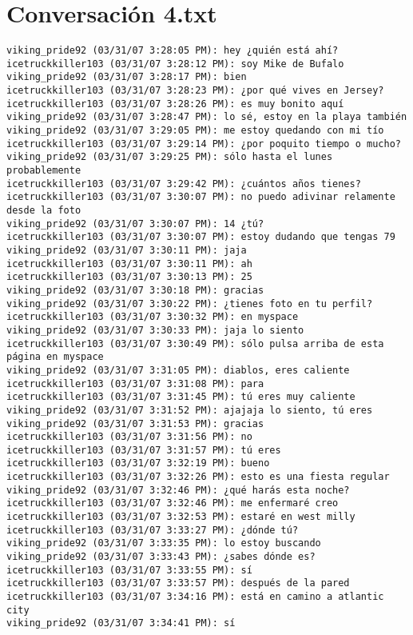 \section{Conversaci\'on 4.txt}

\begin{verbatim}
viking_pride92 (03/31/07 3:28:05 PM): hey ¿quién está ahí?
icetruckkiller103 (03/31/07 3:28:12 PM): soy Mike de Bufalo
viking_pride92 (03/31/07 3:28:17 PM): bien
icetruckkiller103 (03/31/07 3:28:23 PM): ¿por qué vives en Jersey?
icetruckkiller103 (03/31/07 3:28:26 PM): es muy bonito aquí
viking_pride92 (03/31/07 3:28:47 PM): lo sé, estoy en la playa también
viking_pride92 (03/31/07 3:29:05 PM): me estoy quedando con mi tío
icetruckkiller103 (03/31/07 3:29:14 PM): ¿por poquito tiempo o mucho?
viking_pride92 (03/31/07 3:29:25 PM): sólo hasta el lunes probablemente
icetruckkiller103 (03/31/07 3:29:42 PM): ¿cuántos años tienes?
icetruckkiller103 (03/31/07 3:30:07 PM): no puedo adivinar relamente desde la foto
viking_pride92 (03/31/07 3:30:07 PM): 14 ¿tú?
icetruckkiller103 (03/31/07 3:30:07 PM): estoy dudando que tengas 79
viking_pride92 (03/31/07 3:30:11 PM): jaja
icetruckkiller103 (03/31/07 3:30:11 PM): ah
icetruckkiller103 (03/31/07 3:30:13 PM): 25
viking_pride92 (03/31/07 3:30:18 PM): gracias
viking_pride92 (03/31/07 3:30:22 PM): ¿tienes foto en tu perfil? 
icetruckkiller103 (03/31/07 3:30:32 PM): en myspace
viking_pride92 (03/31/07 3:30:33 PM): jaja lo siento
icetruckkiller103 (03/31/07 3:30:49 PM): sólo pulsa arriba de esta página en myspace
viking_pride92 (03/31/07 3:31:05 PM): diablos, eres caliente
icetruckkiller103 (03/31/07 3:31:08 PM): para
icetruckkiller103 (03/31/07 3:31:45 PM): tú eres muy caliente
viking_pride92 (03/31/07 3:31:52 PM): ajajaja lo siento, tú eres
viking_pride92 (03/31/07 3:31:53 PM): gracias
icetruckkiller103 (03/31/07 3:31:56 PM): no
icetruckkiller103 (03/31/07 3:31:57 PM): tú eres 
icetruckkiller103 (03/31/07 3:32:19 PM): bueno
icetruckkiller103 (03/31/07 3:32:26 PM): esto es una fiesta regular 
viking_pride92 (03/31/07 3:32:46 PM): ¿qué harás esta noche?
icetruckkiller103 (03/31/07 3:32:46 PM): me enfermaré creo
icetruckkiller103 (03/31/07 3:32:53 PM): estaré en west milly
icetruckkiller103 (03/31/07 3:33:27 PM): ¿dónde tú?
viking_pride92 (03/31/07 3:33:35 PM): lo estoy buscando
viking_pride92 (03/31/07 3:33:43 PM): ¿sabes dónde es?
icetruckkiller103 (03/31/07 3:33:55 PM): sí
icetruckkiller103 (03/31/07 3:33:57 PM): después de la pared
icetruckkiller103 (03/31/07 3:34:16 PM): está en camino a atlantic city
viking_pride92 (03/31/07 3:34:41 PM): sí

\end{verbatim}
